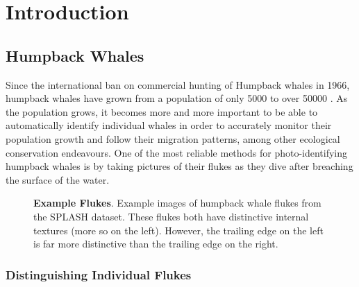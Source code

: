  
\chapter{Introduction} \label{sec:introduction}
 
\section{Humpback Whales}

Since the international ban on commercial hunting of Humpback whales in 1966, humpback whales have grown from a population of only 5000 \cite{baker1993abundant} to over 50000 \cite{branch2011humpback}. 
As the population grows, it becomes more and more important to be able to automatically identify individual whales in order to accurately monitor their population growth and follow their migration patterns, among other ecological conservation endeavours.
One of the most reliable methods for photo-identifying humpback whales is by taking pictures of their flukes as they dive after breaching the surface of the water.

\begin{figure}[t]%
\centering
{}
\newline
{}
\caption{\textbf{Example Flukes}. Example images of humpback whale flukes from the SPLASH \cite{calambokidis2008splash} dataset. These flukes both have distinctive internal textures (more so on the left). However, the trailing edge on the left is far more distinctive than the trailing edge on the right.}
\label{fig:example_fluke}
\end{figure}

\subsection{Distinguishing Individual Flukes}

